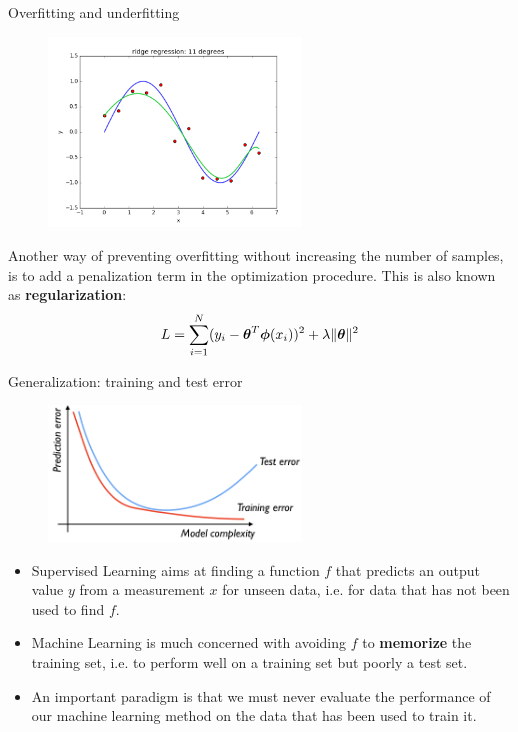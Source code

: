 \documentclass[xcolor=pdftex,dvipsnames,table]{beamer}
\begin{document}
\begin{frame}{Overfitting and underfitting}
\begin{figure}[htb]
\includegraphics[width=0.6\textwidth]{../graphics/ridge_regression_11_10.png}
\end{figure}
Another way of preventing overfitting without increasing the number of samples, is to add a penalization term in the optimization procedure. This is also known as \textbf{regularization}:
\begin{equation}
	L = \sum_{i=1}^N (y_i - \boldsymbol{\theta}^T \boldsymbol{\phi} (x_i))^2 + \lambda \| \boldsymbol{\theta} \|^2
\end{equation}
\end{frame}

\begin{frame}{Generalization: training and test error}
\begin{figure}[htb]
\includegraphics[width=0.6\textwidth]{../graphics/Training_and_test_error.png}
\end{figure}
\begin{itemize}
\item Supervised Learning aims at finding a function $f$ that predicts an output value $y$ from a measurement $x$ for unseen data, i.e. for data that has not been used to find $f$. 
\item Machine Learning is much concerned with avoiding $f$ to \textbf{memorize} the training set, i.e. to perform well on a training set but poorly a test set. 
\item An important paradigm is that we must never evaluate the performance of our machine learning method on the data that has been used to train it.
\end{itemize}
\end{frame}
\end{document}
